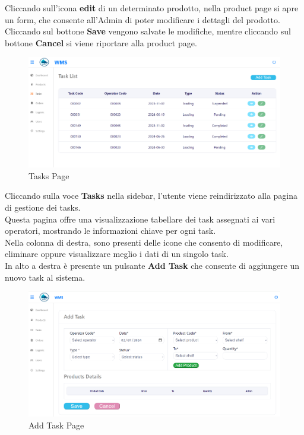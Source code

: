 Cliccando sull'icona \textbf{edit} di un determinato prodotto, nella product page si apre un form, che consente
all'Admin di poter modificare i dettagli del prodotto.\\
Cliccando sul bottone \textbf{Save} vengono salvate le modifiche, mentre cliccando sul bottone \textbf{Cancel} si viene
riportare alla product page.

\begin{figure}[H]
    \centering
    \includegraphics[width=\textwidth]{document/sections/img/Storyboard/taskPage.png}
    \caption{Tasks Page}
    \label{fig:tasksPage}
\end{figure}

Cliccando sulla voce \textbf{Tasks} nella sidebar, l'utente viene reindirizzato alla pagina di gestione dei tasks.\\
Questa pagina offre una visualizzazione tabellare dei task assegnati ai vari operatori,
mostrando le informazioni chiave per ogni task.\\
Nella colonna di destra, sono presenti delle icone che consento di modificare, eliminare oppure visualizzare meglio
i dati di un singolo task.\\
In alto a destra è presente un pulsante \textbf{Add Task} che consente di aggiungere un nuovo task al sistema.

\begin{figure}[H]
    \centering
    \includegraphics[width=\textwidth]{document/sections/img/Storyboard/addTaskPage.png}
    \caption{Add Task Page}
    \label{fig:addTaskPages}
\end{figure}

